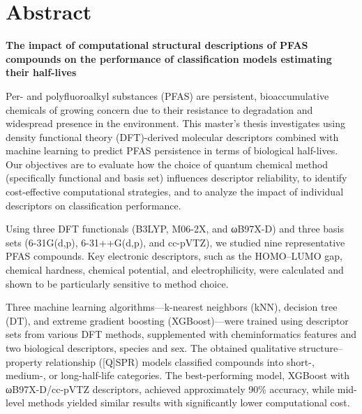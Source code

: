 
\newcommand{\keyword}[1]{\textbf{#1}}
\newcommand{\tabhead}[1]{\textbf{#1}}
\newcommand{\code}[1]{\texttt{#1}}
\newcommand{\file}[1]{\texttt{\bfseries#1}}
\newcommand{\option}[1]{\texttt{\itshape#1}}

\clearpage
\chapter*{\vspace*{-2em} Abstract}
\vspace{-1.2cm}
\textbf{The impact of computational structural descriptions of PFAS compounds on the performance of classification models estimating their half-lives}

\vspace{0.2cm}

Per- and polyfluoroalkyl substances (PFAS) are persistent, bioaccumulative chemicals of growing concern due to their resistance to degradation and widespread presence in the environment. This master’s thesis investigates using density functional theory (DFT)-derived molecular descriptors combined with machine learning to predict PFAS persistence in terms of biological half-lives. Our objectives are to evaluate how the choice of quantum chemical method (specifically functional and basis set) influences descriptor reliability, to identify cost-effective computational strategies, and to analyze the impact of individual descriptors on classification performance.

Using three DFT functionals (B3LYP, M06-2X, and ωB97X-D) and three basis sets (6-31G(d,p), 6-31++G(d,p), and cc-pVTZ), we studied nine representative PFAS compounds. Key electronic descriptors, such as the HOMO–LUMO gap, chemical hardness, chemical potential, and electrophilicity, were calculated and shown to be particularly sensitive to method choice.

Three machine learning algorithms—k-nearest neighbors (kNN), decision tree (DT), and extreme gradient boosting (XGBoost)—were trained using descriptor sets from various DFT methods, supplemented with cheminformatics features and two biological descriptors, species and sex. The obtained qualitative structure–property relationship ([Q]SPR) models classified compounds into short-, medium-, or long-half-life categories. The best-performing model, XGBoost with ωB97X-D/cc-pVTZ descriptors, achieved approximately 90\% accuracy, while mid-level methods yielded similar results with significantly lower computational cost.

